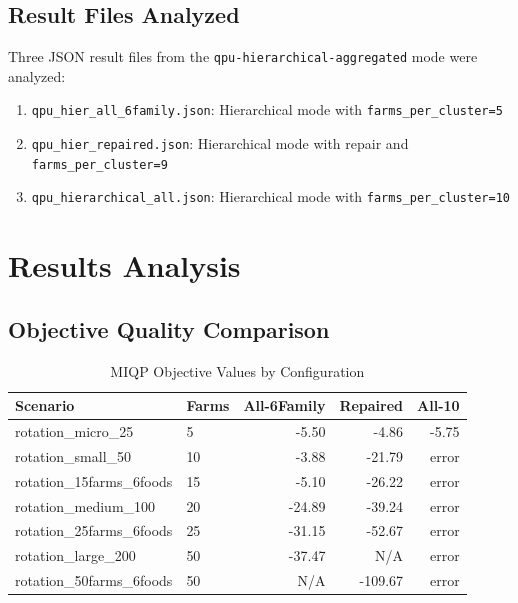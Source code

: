 \documentclass[11pt,a4paper]{article}
\begin{document}
\subsection{Result Files Analyzed}

Three JSON result files from the \texttt{qpu-hierarchical-aggregated} mode were analyzed:

\begin{enumerate}
    \item \texttt{qpu\_hier\_all\_6family.json}: Hierarchical mode with \texttt{farms\_per\_cluster=5}
    \item \texttt{qpu\_hier\_repaired.json}: Hierarchical mode with repair and \texttt{farms\_per\_cluster=9}
    \item \texttt{qpu\_hierarchical\_all.json}: Hierarchical mode with \texttt{farms\_per\_cluster=10}
\end{enumerate}

\section{Results Analysis}

\subsection{Objective Quality Comparison}

\begin{table}[H]
\centering
\caption{MIQP Objective Values by Configuration}
\begin{tabular}{llrrr}
\toprule
\textbf{Scenario} & \textbf{Farms} & \textbf{All-6Family} & \textbf{Repaired} & \textbf{All-10} \\
\midrule
rotation\_micro\_25 & 5 & -5.50 & -4.86 & -5.75 \\
rotation\_small\_50 & 10 & -3.88 & -21.79 & error \\
rotation\_15farms\_6foods & 15 & -5.10 & -26.22 & error \\
rotation\_medium\_100 & 20 & -24.89 & -39.24 & error \\
rotation\_25farms\_6foods & 25 & -31.15 & -52.67 & error \\
rotation\_large\_200 & 50 & -37.47 & N/A & error \\
rotation\_50farms\_6foods & 50 & N/A & -109.67 & error \\
\bottomrule
\end{tabular}
\end{table}
\end{document}
